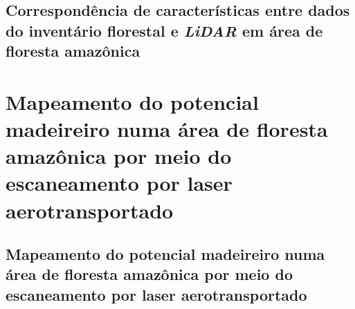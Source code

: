 \documentclass[
	12pt,				%
	openright,			%
	twoside,			%
	a4paper,			%
	chapter=TITLE,		%
	sumario=abnt-6027-2012,
	english,			%
	brazil				%
	]{UFVJM-abntex2}
\newcommand{\li}{\textit{LiDAR }}
\begin{document}
\chapter*{Correspondência de características entre dados do inventário florestal e \li em área de floresta amazônica}


%


\part{Mapeamento do potencial madeireiro numa área de floresta amazônica por meio do escaneamento por laser aerotransportado}

\chapter*{Mapeamento do potencial madeireiro numa área de floresta amazônica por meio do escaneamento por laser aerotransportado}


%

%
%
%
%
%
%
%
%
%
%
%
%
%
%
%
%
\end{document}
